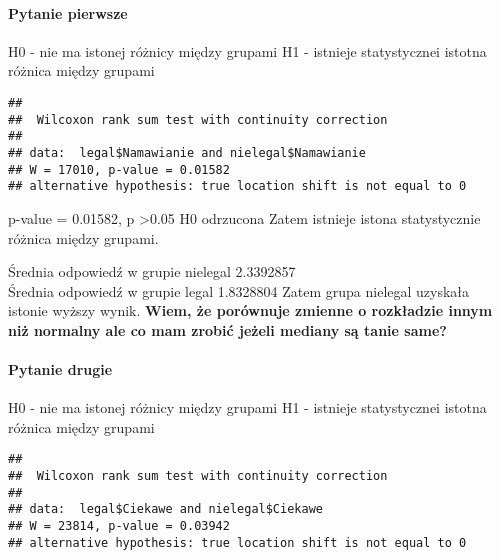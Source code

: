 \documentclass[]{article}
\newenvironment{Shaded}{\begin{snugshade}}{\end{snugshade}}
\newcommand{\KeywordTok}[1]{\textcolor[rgb]{0.13,0.29,0.53}{\textbf{#1}}}
\newcommand{\OperatorTok}[1]{\textcolor[rgb]{0.81,0.36,0.00}{\textbf{#1}}}
\newcommand{\NormalTok}[1]{#1}
\let\oldparagraph\paragraph
\renewcommand{\paragraph}[1]{\oldparagraph{#1}\mbox{}}
\begin{document}
\paragraph{Pytanie pierwsze}\label{pytanie-pierwsze}

H0 - nie ma istonej różnicy między grupami H1 - istnieje statystycznei
istotna różnica między grupami

\begin{Shaded}
\end{Shaded}

\begin{verbatim}
## 
##  Wilcoxon rank sum test with continuity correction
## 
## data:  legal$Namawianie and nielegal$Namawianie
## W = 17010, p-value = 0.01582
## alternative hypothesis: true location shift is not equal to 0
\end{verbatim}

p-value = 0.01582, p \textgreater{}0.05 H0 odrzucona Zatem istnieje
istona statystycznie różnica między grupami.

Średnia odpowiedź w grupie nielegal 2.3392857\\
Średnia odpowiedź w grupie legal 1.8328804 Zatem grupa nielegal uzyskała
istonie wyższy wynik. \textbf{Wiem, że porównuje zmienne o rozkładzie
innym niż normalny ale co mam zrobić jeżeli mediany są tanie same?}

\paragraph{Pytanie drugie}\label{pytanie-drugie}

H0 - nie ma istonej różnicy między grupami H1 - istnieje statystycznei
istotna różnica między grupami

\begin{Shaded}
\end{Shaded}

\begin{verbatim}
## 
##  Wilcoxon rank sum test with continuity correction
## 
## data:  legal$Ciekawe and nielegal$Ciekawe
## W = 23814, p-value = 0.03942
## alternative hypothesis: true location shift is not equal to 0
\end{verbatim}
\end{document}
